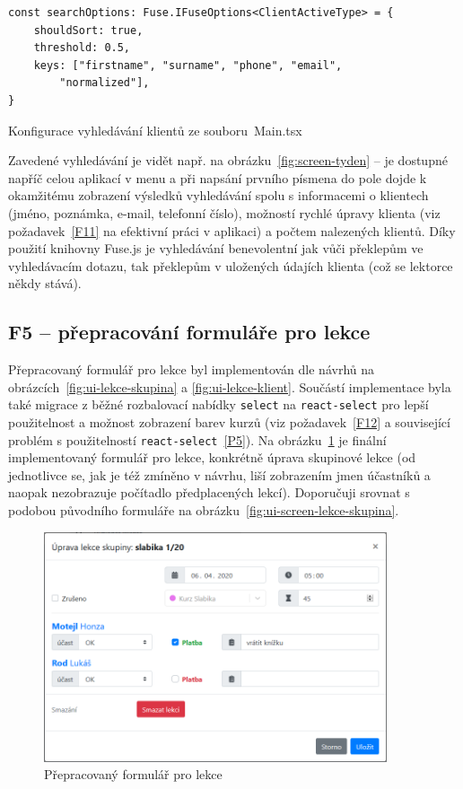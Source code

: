 \begin{listing}[ht]
	\begin{verbatim}
const searchOptions: Fuse.IFuseOptions<ClientActiveType> = {
    shouldSort: true,
    threshold: 0.5,
    keys: ["firstname", "surname", "phone", "email", 
        "normalized"],
}
	\end{verbatim}
	\caption{Konfigurace vyhledávání klientů ze souboru~Main.tsx}\label{lst:fusejs}
\end{listing}

Zavedené vyhledávání je vidět např. na obrázku~\ref{fig:screen-tyden} -- je dostupné napříč celou aplikací v menu a při napsání prvního písmena do pole dojde k okamžitému zobrazení výsledků vyhledávání spolu s informacemi o klientech (jméno, poznámka, e-mail, telefonní číslo), možností rychlé úpravy klienta (viz požadavek~\ref{F11} na efektivní práci v aplikaci) a počtem nalezených klientů. Díky použití knihovny Fuse.js je vyhledávání benevolentní jak vůči překlepům ve vyhledávacím dotazu, tak překlepům v uložených údajích klienta (což se lektorce někdy stává).

\subsection{F5 -- přepracování formuláře pro lekce}

Přepracovaný formulář pro lekce byl implementován dle návrhů na obrázcích~\ref{fig:ui-lekce-skupina} a \ref{fig:ui-lekce-klient}. Součástí implementace byla také migrace z běžné rozbalovací nabídky \verb|select| na \verb|react-select| pro lepší použitelnost a možnost zobrazení barev kurzů (viz požadavek~\ref{F12} a související problém s použitelností \verb|react-select|~\ref{P5}). Na obrázku~\ref{fig:ui-screen-formular-lekce} je finální implementovaný formulář pro lekce, konkrétně úprava skupinové lekce (od jednotlivce se, jak je též zmíněno v návrhu, liší zobrazením jmen účastníků a naopak nezobrazuje počítadlo předplacených lekcí). Doporučuji srovnat s podobou původního formuláře na obrázku~\ref{fig:ui-screen-lekce-skupina}.

\begin{figure}[h]\centering
    \includegraphics[width=0.9\textwidth]{img/ui-screen-formular-lekce.png}
    \caption{Přepracovaný formulář pro lekce}\label{fig:ui-screen-formular-lekce}
\end{figure}

